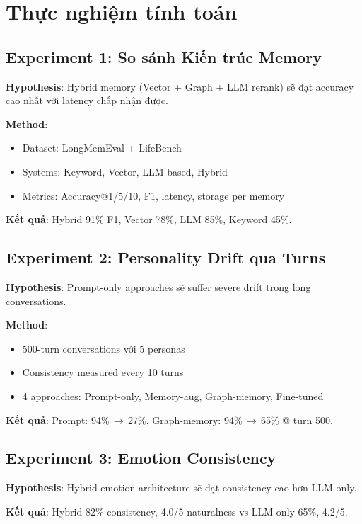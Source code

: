 \section{Thực nghiệm tính toán}

\subsection{Experiment 1: So sánh Kiến trúc Memory}

\textbf{Hypothesis}: Hybrid memory (Vector + Graph + LLM rerank) sẽ đạt accuracy cao nhất với latency chấp nhận được.

\textbf{Method}:
\begin{itemize}
    \item Dataset: LongMemEval + LifeBench
    \item Systems: Keyword, Vector, LLM-based, Hybrid
    \item Metrics: Accuracy@1/5/10, F1, latency, storage per memory
\end{itemize}

\textbf{Kết quả}: Hybrid 91\% F1, Vector 78\%, LLM 85\%, Keyword 45\%.

\subsection{Experiment 2: Personality Drift qua Turns}

\textbf{Hypothesis}: Prompt-only approaches sẽ suffer severe drift trong long conversations.

\textbf{Method}:
\begin{itemize}
    \item 500-turn conversations với 5 personas
    \item Consistency measured every 10 turns
    \item 4 approaches: Prompt-only, Memory-aug, Graph-memory, Fine-tuned
\end{itemize}

\textbf{Kết quả}: Prompt: 94\%\,$\to$\,27\%, Graph-memory: 94\%\,$\to$\,65\% @ turn 500.

\subsection{Experiment 3: Emotion Consistency}

\textbf{Hypothesis}: Hybrid emotion architecture sẽ đạt consistency cao hơn LLM-only.

\textbf{Kết quả}: Hybrid 82\% consistency, 4.0/5 naturalness vs LLM-only 65\%, 4.2/5.

